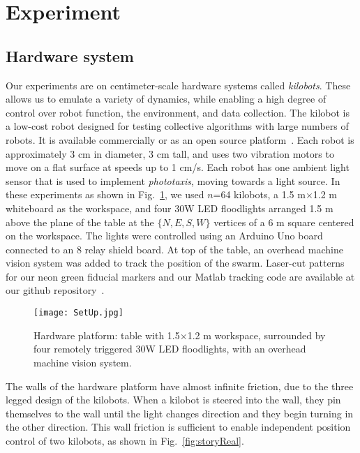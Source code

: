 
\section{Experiment}\label{sec:expResults}



\subsection{Hardware system}


Our experiments are on centimeter-scale hardware systems called \emph{kilobots}.  These allows us to emulate a variety of dynamics, while enabling a high degree of control over robot function, the environment, and data collection. The kilobot \cite{Rubenstein2012,rubenstein2014programmable} is a low-cost robot designed for testing collective algorithms with large numbers of robots. It is available commercially or as an open source platform~\cite{K-Team2015}.  Each robot is approximately 3 cm in diameter, 3 cm tall, and uses two vibration motors to move on a flat surface at speeds up to 1 cm/s.  Each robot has one ambient light sensor that is used to implement \emph{phototaxis},  moving towards a light source. 
In these experiments as shown in Fig.~\ref{fig:setup}, we used $n$=64 kilobots, a 1.5 m$\times$1.2 m whiteboard as the workspace, and four 30W LED floodlights arranged 1.5 m above the plane of the table at the $\{N,E,S,W\}$ vertices of a 6 m square centered on the workspace. The lights were controlled using an Arduino Uno board connected to an 8 relay shield board.  At top of the table, an overhead machine vision system was added to track the position of the swarm. Laser-cut patterns for our neon green fiducial markers and our {\sc Matlab} tracking code are available at our github repository~\cite{Shahrokhi2015GitHubShapeControl}.


\begin{figure}
\begin{center}
	\texttt{[image: SetUp.jpg]}
\end{center}
\caption{\label{fig:setup}
Hardware platform:  table with 1.5$\times$1.2 m workspace, surrounded by four remotely triggered 30W LED floodlights, with an overhead machine vision system.
}
\end{figure}

The walls of the hardware platform have almost infinite friction, due to the three legged design of the kilobots. When a kilobot is steered into the wall, they pin themselves to the wall until the light changes direction and they begin turning in the other direction.  This wall friction is sufficient to enable independent position control of two kilobots, as shown in Fig.~\ref{fig:storyReal}.



